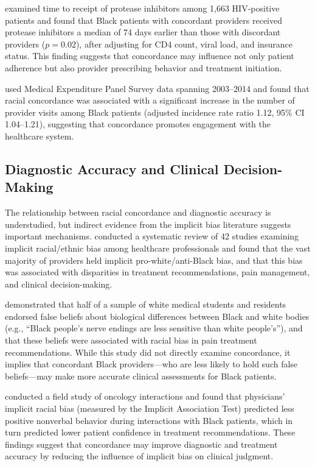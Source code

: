 \documentclass[12pt]{article}
\begin{document}
\citet{king2004} examined time to receipt of protease inhibitors among 1,663 HIV-positive patients and found that Black patients with concordant providers received protease inhibitors a median of 74 days earlier than those with discordant providers ($p = 0.02$), after adjusting for CD4 count, viral load, and insurance status. This finding suggests that concordance may influence not only patient adherence but also provider prescribing behavior and treatment initiation.

\citet{ma2019} used Medical Expenditure Panel Survey data spanning 2003--2014 and found that racial concordance was associated with a significant increase in the number of provider visits among Black patients (adjusted incidence rate ratio 1.12, 95\% CI 1.04--1.21), suggesting that concordance promotes engagement with the healthcare system.

\subsection{Diagnostic Accuracy and Clinical Decision-Making}

The relationship between racial concordance and diagnostic accuracy is understudied, but indirect evidence from the implicit bias literature suggests important mechanisms. \citet{hall2015} conducted a systematic review of 42 studies examining implicit racial/ethnic bias among healthcare professionals and found that the vast majority of providers held implicit pro-white/anti-Black bias, and that this bias was associated with disparities in treatment recommendations, pain management, and clinical decision-making.

\citet{hoffman2016} demonstrated that half of a sample of white medical students and residents endorsed false beliefs about biological differences between Black and white bodies (e.g., ``Black people's nerve endings are less sensitive than white people's''), and that these beliefs were associated with racial bias in pain treatment recommendations. While this study did not directly examine concordance, it implies that concordant Black providers---who are less likely to hold such false beliefs---may make more accurate clinical assessments for Black patients.

\citet{penner2010} conducted a field study of oncology interactions and found that physicians' implicit racial bias (measured by the Implicit Association Test) predicted less positive nonverbal behavior during interactions with Black patients, which in turn predicted lower patient confidence in treatment recommendations. These findings suggest that concordance may improve diagnostic and treatment accuracy by reducing the influence of implicit bias on clinical judgment.
\end{document}
